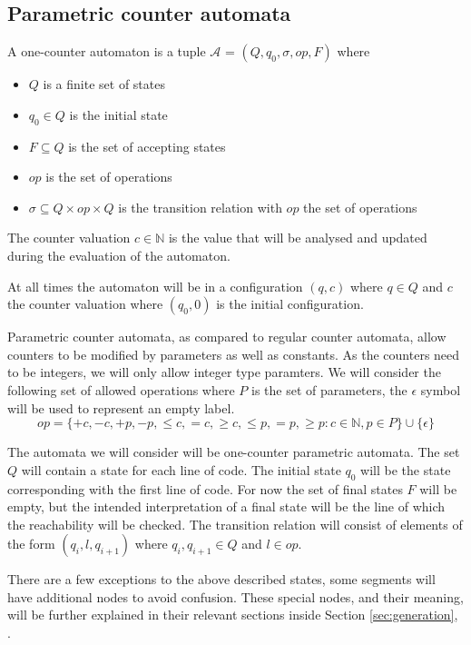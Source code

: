 \documentclass[12pt]{article}
\begin{document}
\subsection{Parametric counter automata}

A one-counter automaton is a tuple $\mathcal{A}$ = $(Q, q_0, \sigma, op, F)$ where
\begin{itemize}
	\item $Q$ is a finite set of states
	\item $q_0 \in Q$ is the initial state
	\item $F \subseteq Q$ is the set of accepting states
	\item $op$ is the set of operations
	\item $\sigma \subseteq Q \times op \times Q$ is the transition relation with $op$ the set of operations
\end{itemize}

The counter valuation $c \in \mathbb{N}$ is the value that will be analysed and updated during the evaluation of the automaton.

At all times the automaton will be in a configuration $(q, c)$ where $q \in Q$ and $c$ the counter valuation where $(q_0, 0)$ is the initial configuration.

Parametric counter automata, as compared to regular counter automata, allow counters to be modified by parameters as well as constants. As the counters need to be integers, we will only allow integer type paramters. We will consider the following set of allowed operations where $P$ is the set of parameters, the $\epsilon$ symbol will be used to represent an empty label.
\[
 op = \{+c, -c, +p, -p, \leq c, =c, \geq c, \leq p, =p, \geq p: c \in \mathbb{N}, p \in P\} \cup \{\epsilon\}
\]

The automata we will consider will be one-counter parametric automata. The set $Q$ will contain a state for each line of code. The initial state $q_0$ will be the state corresponding with the first line of code. For now the set of final states $F$ will be empty, but the intended interpretation of a final state will be the line of which the reachability will be checked. The transition relation will consist of elements of the form $(q_i, l, q_{i+1})$ where $q_i, q_{i+1} \in Q$ and $l \in op$. 

There are a few exceptions to the above described states, some segments will have additional nodes to avoid confusion. These special nodes, and their meaning, will be further explained in their relevant sections inside Section \ref{sec:generation}, .
\end{document}
